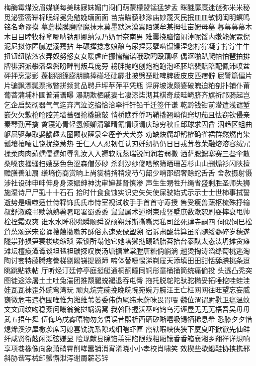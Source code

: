 梅酶霉煤没眉媒镁每美昧寐妹媚门闷们萌蒙檬盟锰猛梦孟
眯醚靡糜迷谜弥⽶米秘觅泌蜜密幂棉眠绵冕免勉娩缅⾯面
苗描瞄藐秒渺庙妙蔑灭民抿⽫皿敏悯闽明螟鸣铭名命谬摸
摹蘑模膜磨摩魔抹末莫墨默沫漠寞陌谋牟某拇牡亩姆母墓
暮幕募慕⽊木⽬目睦牧穆拿哪呐钠那娜纳氖乃奶耐奈南男
难囊挠脑恼闹淖呢馁内嫩能妮霓倪泥尼拟你匿腻逆溺蔫拈
年碾撵捻念娘酿鸟尿捏聂孽啮镊镍涅您柠狞凝宁拧泞⽜牛
扭钮纽脓浓农弄奴努怒⼥女暖虐疟挪懦糯诺哦欧鸥殴藕呕
偶沤啪趴爬帕怕琶拍排牌徘湃派攀潘盘磐盼畔判叛乓庞旁
耪胖抛咆刨炮袍跑泡呸胚培裴赔陪配佩沛喷盆砰抨烹澎彭
蓬棚硼篷膨朋鹏捧碰坯砒霹批披劈琵毗啤脾疲⽪皮匹痞僻
屁譬篇偏⽚片骗飘漂瓢票撇瞥拼频贫品聘乒坪苹萍平凭瓶
评屏坡泼颇婆破魄迫粕剖扑铺仆莆葡菩蒲埔朴圃普浦谱曝
瀑期欺栖戚妻七凄漆柒沏其棋奇歧畦崎脐齐旗祈祁骑起岂
乞企启契砌器⽓气迄弃汽泣讫掐恰洽牵扦钎铅千迁签仟谦
乾黔钱钳前潜遣浅谴堑嵌⽋欠歉枪呛腔羌墙蔷强抢橇锹敲
悄桥瞧乔侨巧鞘撬翘峭俏窍切茄且怯窃钦侵亲秦琴勤芹擒
禽寝沁青轻氢倾卿清擎晴氰情顷请庆琼穷秋丘邱球求囚酋
泅趋区蛆曲躯屈驱渠取娶龋趣去圈颧权醛泉全痊拳⽝犬券
劝缺炔瘸却鹊榷确雀裙群然燃冉染瓤壤攘嚷让饶扰绕惹热
壬仁⼈人忍韧任认刃妊纫扔仍⽇日戎茸蓉荣融熔溶容绒冗
揉柔⾁肉茹蠕儒孺如辱乳汝⼊入褥软阮蕊瑞锐闰润若弱撒
洒萨腮鳃塞赛三叁伞散桑嗓丧搔骚扫嫂瑟⾊色涩森僧莎砂
杀刹沙纱傻啥煞筛晒珊苫杉⼭山删煽衫闪陕擅赡膳善汕扇
缮墒伤商赏晌上尚裳梢捎稍烧芍勺韶少哨邵绍奢赊蛇⾆舌
舍赦摄射慑涉社设砷申呻伸⾝身深娠绅神沈审婶甚肾慎渗
声⽣生甥牲升绳省盛剩胜圣师失狮施湿诗⼫尸虱⼗十⽯石
拾时什⾷食蚀实识史⽮矢使屎驶始式⽰示⼠士世柿事拭誓
逝势是嗜噬适仕侍释饰⽒氏市恃室视试收⼿手⾸首守寿授
售受瘦兽蔬枢梳殊抒输叔舒淑疏书赎孰熟薯暑曙署蜀⿉黍
⿏鼠属术述树束戍竖墅庶数漱恕刷耍摔衰甩帅栓拴霜双爽
谁⽔水睡税吮瞬顺舜说硕朔烁斯撕嘶思私司丝死肆寺嗣四
伺似饲巳松耸怂颂送宋讼诵搜艘擞嗽苏酥俗素速粟僳塑溯
宿诉肃酸蒜算虽隋随绥髓碎岁穗遂隧祟孙损笋蓑梭唆缩琐
索锁所塌他它她塔獭挞蹋踏胎苔抬台泰酞太态汰坍摊贪瘫
滩坛檀痰潭谭谈坦毯袒碳探叹炭汤塘搪堂棠膛唐糖倘躺淌
趟烫掏涛滔绦萄桃逃淘陶讨套特藤腾疼誊梯剔踢锑提题蹄
啼体替嚏惕涕剃屉天添填⽥田甜恬舔腆挑条迢眺跳贴铁帖
厅听烃汀廷停亭庭挺艇通桐酮瞳同铜彤童桶捅筒统痛偷投
头透凸秃突图徒途涂屠⼟土吐兔湍团推颓腿蜕褪退吞屯臀
拖托脱鸵陀驮驼椭妥拓唾挖哇蛙洼娃⽡瓦袜歪外豌弯湾玩
顽丸烷完碗挽晚皖惋宛婉万腕汪王亡枉⽹网往旺望忘妄威
巍微危韦违桅围唯惟为潍维苇萎委伟伪尾纬未蔚味畏胃喂
魏位渭谓尉慰卫瘟温蚊⽂文闻纹吻稳紊问嗡翁瓮挝蜗涡窝
我斡卧握沃巫呜钨乌污诬屋⽆无芜梧吾吴⽏毋武五捂午舞
伍侮坞戊雾晤物勿务悟误昔熙析西硒矽晰嘻吸锡牺稀息希
悉膝⼣夕惜熄烯溪汐犀檄袭席习媳喜铣洗系隙戏细瞎虾匣
霞辖暇峡侠狭下厦夏吓掀锨先仙鲜纤咸贤衔舷闲涎弦嫌显
险现献县腺馅羡宪陷限线相厢镶⾹香箱襄湘乡翔祥详想响
享项巷橡像向象萧硝霄削哮嚣销消宵淆晓⼩小孝校肖啸笑
效楔些歇蝎鞋协挟携邪斜胁谐写械卸蟹懈泄泻谢屑薪芯锌
